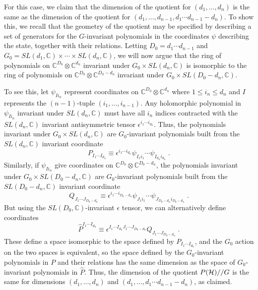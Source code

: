 \documentclass[12pt]{article}
\theoremstyle{definition}
\newcommand{\be}{\begin{equation}}
\newcommand{\ee}{\end{equation}}
\begin{document}
\begin{itemize}
For this case, we claim that the dimension of the quotient for $(d_1, \dots , d_n)$ is the same as the dimension of the quotient for $(d_1, \dots ,d_{n-1}, d_1 \cdots d_{n-1} - d_n)$. To show this, we recall that the geometry of the quotient may be specified by describing a set of generators for the $G$-invariant polynomials in the coordinates $\psi$ describing the state, together with their relations. Letting $D_0 = d_1 \cdots d_{n-1}$ and $G_0 = SL(d_1, \mathbb{C}) \times \cdots \times SL(d_n, \mathbb{C})$, we will now argue that the ring of polynomials on $\mathbb{C}^{D_0}  \otimes \mathbb{C}^{d_n}$ invariant under $G_0 \times SL(d_n, \mathbb{C})$ is isomorphic to the ring of polynomials on $\mathbb{C}^{D_0}  \otimes \mathbb{C}^{{D_0} - d_n}$ invariant under $G_0 \times SL({D_0} - d_n, \mathbb{C})$.

To see this, let $\psi_{I i_n}$ represent coordinates on $\mathbb{C}^{D_0}  \otimes \mathbb{C}^{d_n}$ where $1 \le i_n \le d_n$ and $I$ represents the $(n-1)$-tuple $(i_1, \dots, i_{n-1})$. Any holomorphic polynomial in $\psi_{I i_n}$ invariant under $SL(d_n, \mathbb{C})$ must have all $i_n$ indices contracted with the $SL(d_n, \mathbb{C})$ invariant antisymmetric tensor $\epsilon^{i_1 \cdots i_{d_n}}$. Thus, the polynomials invariant under $G_0 \times SL(d_n, \mathbb{C})$ are $G_0$-invariant polynomials built from the $SL(d_n, \mathbb{C})$ invariant coordinate
\be
P_{I_1 \cdots I_{d_n}} \equiv \epsilon^{i_1 \cdots i_{d_n}} \psi_{I_1 i_1} \cdots \psi_{I_{d_n} i_{d_n}} \; .
\ee
Similarly, if $\psi_{I i_n}$ give coordinates on $\mathbb{C}^{D_0}  \otimes \mathbb{C}^{{D_0} - d_n}$, the polynomials invariant under $G_0 \times SL({D_0} - d_n, \mathbb{C})$ are $G_0$-invariant polynomials built from the $SL({D_0} - d_n, \mathbb{C})$ invariant coordinate
\be
Q_{J_1 \cdots J_{{D_0} - d_n}} \equiv \epsilon^{i_1 \cdots i_{{D_0} - d_n}} \psi_{J_1 i_1} \cdots \psi_{J_{{D_0} - d_n}  i_{D_0 - d_n}} \; .
\ee
But using the $SL({D_0},\mathbb{C})$-invariant $\epsilon$ tensor, we can alternatively define coordinates
\be
\hat{P}^{I_1 \cdots I_{d_n}} \equiv \epsilon^{I_1 \cdots I_{d_n} J_1 \cdots J_{{D_0}-d_n}} Q_{J_1 \cdots J_{{D_0} - d_n}} \; .
\ee
These define a space isomorphic to the space defined by $P_{I_1 \cdots I_{d_n}}$, and the $G_0$ action on the two spaces is equivalent, so the space defined by the $G_0$-invariant polynomials in $P$ and their relations has the same dimension as the space of $G_0$-invariant polynomials in $\hat{P}$. Thus, the dimension of the quotient $P({\cal H})//G$ is the same for dimensions $(d_1, \dots , d_n)$ and $(d_1, \dots , d_1 \cdots d_{n-1} - d_n)$, as claimed.
\end{itemize}
\end{document}
